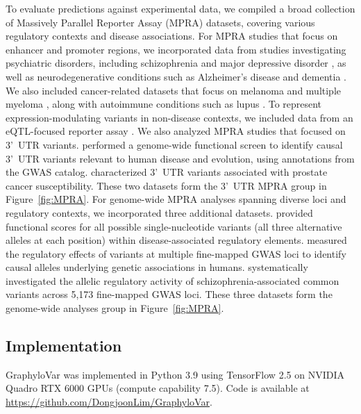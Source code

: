 \documentclass[unnumsec,webpdf,contemporary,large]{oup-authoring-template}%
\newcommand{\rev}[1]{{\color{red}#1}}
\theoremstyle{thmstyleone}%
\theoremstyle{thmstyletwo}%
\theoremstyle{thmstylethree}%
\begin{document}
To evaluate predictions against experimental data, we compiled a broad collection of Massively Parallel Reporter Assay (MPRA) datasets, covering various regulatory contexts and disease associations.
For MPRA studies that focus on enhancer and promoter regions, we incorporated data from studies investigating psychiatric disorders, including schizophrenia \citep{Myint2020} and major depressive disorder \citep{Mulvey2021}, as well as neurodegenerative conditions such as Alzheimer's disease and dementia \citep{Myint2020, Cooper2022}. We also included cancer-related datasets that focus on melanoma \citep{Long2022, Choi2020} and multiple myeloma \citep{Ajore2022}, along with autoimmune conditions such as lupus \citep{Lu2021}. To represent expression-modulating variants in non-disease contexts, we included data from an eQTL-focused reporter assay \citep{Tewhey2016}.
\rev{We also analyzed MPRA studies that focused on 3'~UTR variants. \citet{Griesemer2021} performed a genome-wide functional screen to identify causal 3'~UTR variants relevant to human disease and evolution, using annotations from the GWAS catalog. \citet{Schuster2023} characterized 3'~UTR variants associated with prostate cancer susceptibility. These two datasets form the 3'~UTR MPRA group in Figure~\ref{fig:MPRA}.}
\rev{For genome-wide MPRA analyses spanning diverse loci and regulatory contexts, we incorporated three additional datasets. \citet{Kircher2019} provided functional scores for all possible single-nucleotide variants (all three alternative alleles at each position) within disease-associated regulatory elements. \citet{Abell2022} measured the regulatory effects of variants at multiple fine-mapped GWAS loci to identify causal alleles underlying genetic associations in humans. \citet{McAfee2023} systematically investigated the allelic regulatory activity of schizophrenia-associated common variants across 5{,}173 fine-mapped GWAS loci. These three datasets form the genome-wide analyses group in Figure~\ref{fig:MPRA}.}

\subsection{Implementation}

GraphyloVar was implemented in Python 3.9 using TensorFlow 2.5 on NVIDIA Quadro RTX 6000 GPUs (compute capability 7.5). Code is available at \url{https://github.com/DongjoonLim/GraphyloVar}. %
\end{document}

